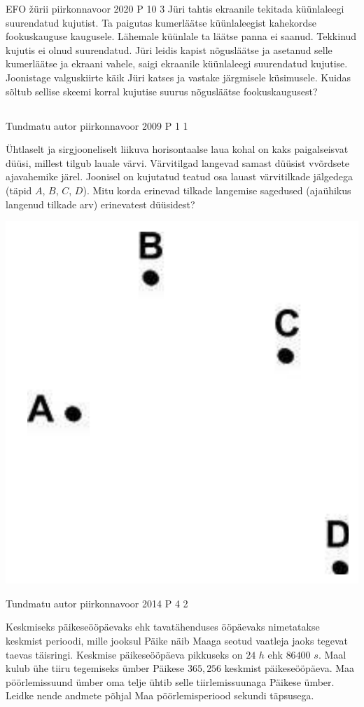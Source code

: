 \documentclass[11pt]{article}
\begin{document}
{%
{EFO žürii} %
{piirkonnavoor} %
{2020} %
{P 10} %
{3} %
{
\ifStatement
Jüri tahtis ekraanile tekitada küünlaleegi suurendatud kujutist. Ta paigutas kumerläätse küünlaleegist kahekordse fookuskauguse kaugusele. Lähemale küünlale ta läätse panna ei saanud. Tekkinud kujutis ei olnud suurendatud. Jüri leidis kapist nõgusläätse ja asetanud selle kumerläätse ja ekraani vahele, saigi ekraanile küünlaleegi suurendatud kujutise. Joonistage valguskiirte käik Jüri katses ja vastake järgmisele küsimusele. Kuidas sõltub sellise skeemi korral kujutise suurus nõgusläätse fookuskaugusest?
\fi
}

\newpage\subsection{\protect{}}

{Tundmatu autor} %
{piirkonnavoor} %
{2009} %
{P 1} %
{1} %
{
\ifStatement
Ühtlaselt ja sirgjooneliselt liikuva horisontaalse laua kohal on kaks paigalseisvat düüsi, millest tilgub lauale värvi. Värvitilgad langevad samast düüsist vvõrdsete ajavahemike järel. Joonisel on kujutatud teatud osa lauast värvitilkade jälgedega (täpid $A$, $B$, $C$, $D$). Mitu korda erinevad tilkade langemise sagedused (ajaühikus langenud tilkade arv) erinevatest düüsidest?
\begin{center}
	\includegraphics[width=0.5\linewidth]{2009-v2p-01-yl.PNG}
\end{center}
\fi
}

{Tundmatu autor} %
{piirkonnavoor} %
{2014} %
{P 4} %
{2} %
{
\ifStatement
Keskmiseks päikeseööpäevaks ehk tavatähenduses ööpäevaks nimetatakse keskmist perioodi, mille jooksul Päike näib Maaga seotud vaatleja jaoks tegevat taevas täisringi. Keskmise päikeseööpäeva pikkuseks on $24$ $h$ ehk $86 400$ $s$. Maal kulub ühe tiiru tegemiseks ümber Päikese $365,256$ keskmist päikeseööpäeva. Maa pöörlemissuund ümber oma telje ühtib selle tiirlemissuunaga Päikese ümber. Leidke nende andmete põhjal Maa pöörlemisperiood sekundi täpsusega.


}}
\end{document}
